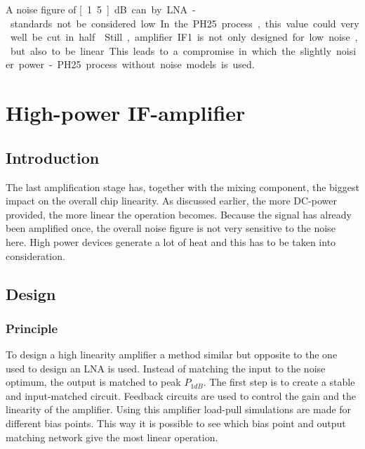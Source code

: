			A noise figure of \unit[1.5]{dB} can by LNA-standards not be considered low. In the PH25 process, this value could very well be cut in half.\autocite{kyuko96} Still, amplifier IF1 is not only designed for low noise, but also to be linear. This leads to a compromise in which the slightly noisier power-PH25 process without noise models is used.


	\section{High-power IF-amplifier}
		\subsection{Introduction}\label{sec:if2power}
			The last amplification stage has, together with the mixing component, the biggest impact on the overall chip linearity. As discussed earlier, the more DC-power provided, the more linear the operation becomes. Because the signal has already been amplified once, the overall noise figure is not very sensitive to the noise here. High power devices generate a lot of heat and this has to be taken into consideration.

		\subsection{Design}
			\subsubsection{Principle}
				To design a high linearity amplifier a method similar but opposite to the one used to design an LNA is used. Instead of matching the input to the noise optimum, the output is matched to peak $P_{1dB}$. The first step is to create a stable and input-matched circuit. Feedback circuits are used to control the gain and the linearity of the amplifier. Using this amplifier load-pull simulations are made for different bias points. This way it is possible to see which bias point and output matching network give the most linear operation.\autocite{anand08}

